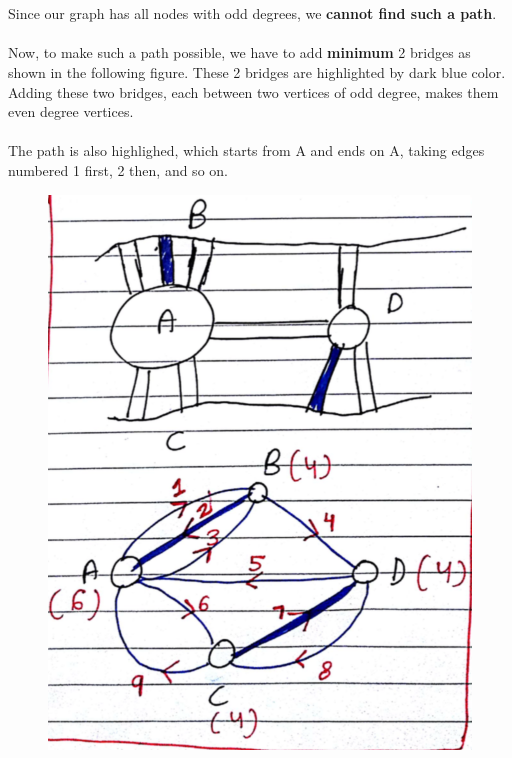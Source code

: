 \documentclass[12pt]{report}
\begin{document}
\\ \\ 
Since our graph has all nodes with odd degrees, we \textbf{cannot find such a path}.
\\ \\ 
Now, to make such a path possible, we have to add \textbf{minimum} 2 bridges as shown in the following figure. These 2 bridges are highlighted by dark blue color. Adding these two bridges, each between two vertices of odd degree, makes them even degree vertices. 
\\ \\ 
The path is also highlighed, which starts from A and ends on A, taking edges numbered 1 first, 2 then, and so on. 
\begin{figure}[H]
	\vspace{0pt}
	\includegraphics[width=\linewidth, keepaspectratio]{Snapshots/q5_2.png}
\end{figure} 
\end{document}
